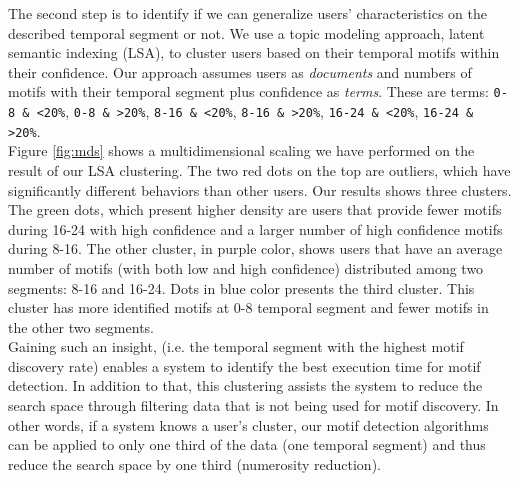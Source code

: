 \documentclass{sig-alternate}
\begin{document}
\vspace{-0.4cm}
The second step is to identify if we can generalize users' characteristics on the described temporal segment or not. We use a topic modeling approach, latent semantic indexing \cite{lsa} (LSA), to cluster users based on their temporal motifs within their confidence. Our approach assumes users as \emph{documents} and numbers of motifs with their temporal segment plus confidence as \emph{terms}. These are terms: \texttt{0-8 \& <20\%}, \texttt{0-8 \& >20\%}, \texttt{8-16 \& <20\%}, \texttt{8-16 \& >20\%}, \texttt{16-24 \& <20\%}, \texttt{16-24 \& >20\%}.  \\
Figure \ref{fig:mds} shows a multidimensional scaling \cite{mds} we have performed on the result of our LSA clustering. The two red dots on the top are outliers, which have significantly different behaviors than other users. Our results shows three clusters. The green dots, which present higher density are users that provide fewer motifs during 16-24 with high confidence and a larger number of high confidence motifs during 8-16. The other cluster, in purple color, shows users that have an average number of motifs (with both low and high confidence) distributed among two segments: 8-16 and 16-24. Dots in blue color presents the third cluster. This cluster has more identified motifs at 0-8 temporal segment and fewer motifs in the other two segments. \\
Gaining such an insight, (i.e. the temporal segment with the highest motif discovery rate) enables a system to identify the best execution time for motif detection. In addition to that, this clustering assists the system to reduce the search space through filtering data that is not being used for motif discovery. In other words, if a system knows a user's cluster, our motif detection algorithms can be applied to only one third of the data (one temporal segment) and thus reduce the search space by one third (numerosity reduction).
\vspace{-0.2cm}
\end{document}
